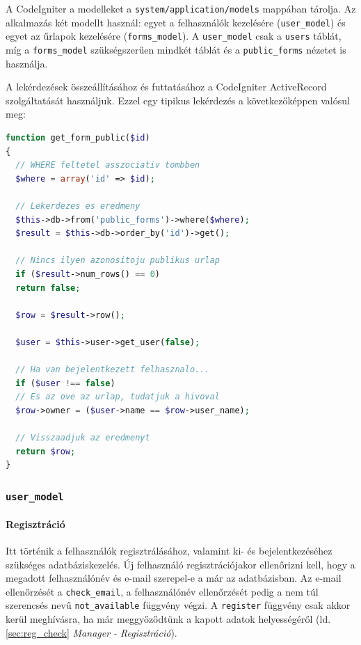 \documentclass[12pt,a4paper,twoside]{article}
\begin{document}
A CodeIgniter a modelleket a \texttt{system/application/models} mappában
tárolja. Az alkalmazás két modellt használ: egyet a felhasználók kezelésére
(\texttt{user\_model}) és egyet az űrlapok kezelésére (\texttt{forms\_model}). A
\texttt{user\_model} csak a \texttt{users} táblát, míg a
\texttt{forms\_model} szükségszerűen mindkét táblát és a \texttt{public\_forms}
nézetet is használja.

A lekérdezések összeállításához és futtatásához a CodeIgniter ActiveRecord
szolgáltatását használjuk. Ezzel egy tipikus lekérdezés a következőképpen
valósul meg:

\begin{lstlisting}[language=PHP]
function get_form_public($id)
{
  // WHERE feltetel asszociativ tombben
  $where = array('id' => $id);

  // Lekerdezes es eredmeny
  $this->db->from('public_forms')->where($where);
  $result = $this->db->order_by('id')->get();

  // Nincs ilyen azonositoju publikus urlap
  if ($result->num_rows() == 0)
  return false;

  $row = $result->row();

  $user = $this->user->get_user(false);

  // Ha van bejelentkezett felhasznalo...
  if ($user !== false)
  // Es az ove az urlap, tudatjuk a hivoval
  $row->owner = ($user->name == $row->user_name);

  // Visszaadjuk az eredmenyt
  return $row;
}
\end{lstlisting}
\vspace{.8cm}

\subsubsection{\texttt{user\_model}}

\paragraph{Regisztráció}
Itt történik a felhasználók regisztrálásához, valamint ki- és bejelentkezéséhez
szükséges adatbáziskezelés. Új felhasználó regisztrációjakor ellenőrizni
kell, hogy a megadott felhasználónév és e-mail szerepel-e a már az
adatbázisban. Az e-mail ellenőrzését a \texttt{check\_email}, a felhasználónév
ellenőrzését pedig a nem túl szerencsés nevű \texttt{not\_available} függvény
végzi. A \texttt{register} függvény csak akkor kerül meghívásra, ha már
meggyőződtünk a kapott adatok helyességéről (ld. \ref{sec:reg_check} \textit{Manager -
Regisztráció}).
\end{document}
